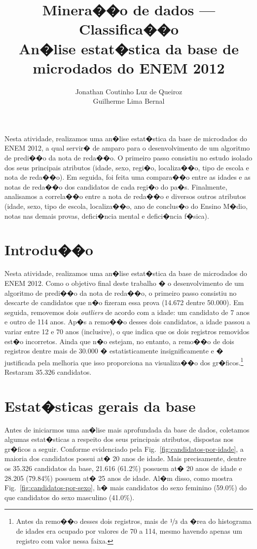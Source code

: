 \documentclass[12pt]{article}
\title{Minera��o de dados --- Classifica��o \\ An�lise estat�stica da base de microdados do ENEM 2012}
\author{Jonathan Coutinho Luz de Queiroz\inst{1} \\ Guilherme Lima Bernal\inst{1}}
\newcommand{\reffig}[1]{Fig.~\ref{fig:#1}}
\begin{document}
\maketitle

\begin{resumo}
Nesta atividade, realizamos uma an�lise estat�stica da base de microdados do ENEM 2012, a qual servir� de amparo para o desenvolvimento de um algoritmo de predi��o da nota de reda��o.
O primeiro passo consistiu no estudo isolado dos seus principais atributos (idade, sexo, regi�o, localiza��o, tipo de escola e nota de reda��o).
Em seguida, foi feita uma compara��o entre as idades e as notas de reda��o dos candidatos de cada regi�o do pa�s.
Finalmente, analisamos a correla��o entre a nota de reda��o e diversos outros atributos (idade, sexo, tipo de escola, localiza��o, ano de conclus�o do Ensino M�dio, notas nas demais provas, defici�ncia mental e defici�ncia f�sica).
\end{resumo}

\section{Introdu��o}
Nesta atividade, realizamos uma an�lise estat�stica da base de microdados do ENEM 2012.
Como o objetivo final deste trabalho � o desenvolvimento de um algoritmo de predi��o da nota de reda��o, o primeiro passo consistiu no descarte de candidatos que n�o fizeram essa prova (14.672 dentre 50.000).
Em seguida, removemos dois \emph{outliers} de acordo com a idade: um candidato de 7 anos e outro de 114 anos.
Ap�s a remo��o desses dois candidatos, a idade passou a variar entre 12 e 70 anos (inclusive), o que indica que os dois registros removidos est�o incorretos.
Ainda que n�o estejam, no entanto, a remo��o de dois registros dentre mais de 30.000 � estatisticamente insignificamente e � justificada pela melhoria que isso proporciona na visualiza��o dos gr�ficos.\footnote{Antes da remo��o desses dois registros, mais de $\nicefrac{1}{3}$ da �rea do histograma de idades era ocupado por valores de 70 a 114, mesmo havendo apenas um registro com valor nessa faixa.}
Restaram 35.326 candidatos.

\section{Estat�sticas gerais da base}
\label{sec:estatisticas-gerais}
Antes de iniciarmos uma an�lise mais aprofundada da base de dados, coletamos algumas estat�sticas a respeito dos seus principais atributos, dispostas nos gr�ficos a seguir.
Conforme evidenciado pela \reffig{candidatos-por-idade}, a maioria dos candidatos possui at� 20 anos de idade.
Mais precisamente, dentre os 35.326 candidatos da base, 21.616 (61.2\%) possuem at� 20 anos de idade e 28.205 (79.84\%) possuem at� 25 anos de idade.
Al�m disso, como mostra \reffig{candidatos-por-sexo}, h� mais candidatos do sexo feminino (59.0\%) do que candidatos do sexo masculino (41.0\%).
\end{document}
